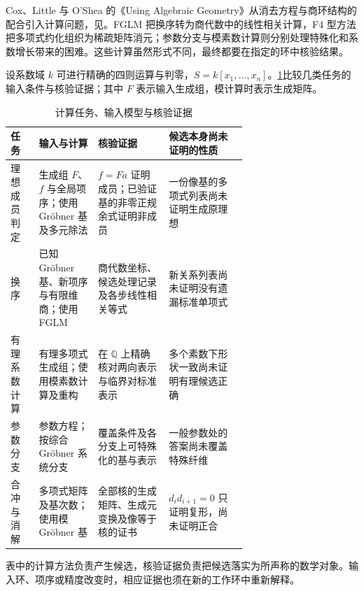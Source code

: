 \ProseParagraphBreak
Cox、Little 与 O'Shea 的《Using Algebraic Geometry》从消去方程与商环结构的配合引入计算问题，见\cite[Chapter 2, pp. 24--25]{CoxLittleOShea1998UsingAG}。FGLM 把换序转为商代数中的线性相关计算，F4 型方法把多项式约化组织为稀疏矩阵消元；参数分支与模素数计算则分别处理特殊化和系数增长带来的困难。这些计算虽然形式不同，最终都要在指定的环中核验结果。

设系数域 \(k\) 可进行精确的四则运算与判零，\(S=k[x_1,\ldots,x_n]\)。\cref{b3:tab:B-computation-certificates}比较几类任务的输入条件与核验证据；其中 \(F\) 表示输入生成组，模计算时表示生成矩阵。

\begin{table}[htbp]
	\centering
	\caption{计算任务、输入模型与核验证据}
	\label{b3:tab:B-computation-certificates}
	\begin{tabularx}{\linewidth}{@{}>{\raggedright\arraybackslash}p{0.12\linewidth}>{\raggedright\arraybackslash}p{0.25\linewidth}>{\raggedright\arraybackslash}p{0.30\linewidth}>{\raggedright\arraybackslash}X@{}}
		\toprule
		任务 & 输入与计算 & 核验证据 & 候选本身尚未证明的性质 \\
		\midrule
		理想成员判定 & 生成组 \(F\)、\(f\) 与全局项序；使用 Gröbner 基及多元除法 & \(f=Fa\) 证明成员；已验证基的非零正规余式证明非成员 & 一份像基的多项式列表尚未证明生成原理想 \\
		换序 & 已知 Gröbner 基、新项序与有限维商；使用 FGLM & 商代数坐标、候选处理记录及各步线性相关等式 & 新关系列表尚未证明没有遗漏标准单项式 \\
		有理系数计算 & 有理多项式生成组；使用模素数计算及重构 & 在 \(\mathbb Q\) 上精确核对两向表示与临界对标准表示 & 多个素数下形状一致尚未证明有理候选正确 \\
		参数分支 & 参数方程；按综合 Gröbner 系统分支 & 覆盖条件及各分支上可特殊化的基与表示 & 一般参数处的答案尚未覆盖特殊纤维 \\
		合冲与消解 & 多项式矩阵及基次数；使用模 Gröbner 基 & 全部核的生成矩阵、生成元变换及像等于核的证书 & \(d_id_{i+1}=0\) 只证明复形，尚未证明正合 \\
		\bottomrule
	\end{tabularx}
\end{table}

表中的计算方法负责产生候选，核验证据负责把候选落实为所声称的数学对象。输入环、项序或精度改变时，相应证据也须在新的工作环中重新解释。






